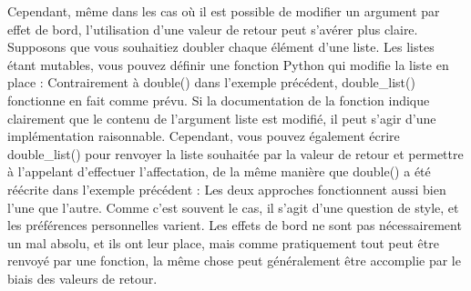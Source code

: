 Cependant, même dans les cas où il est possible de modifier un argument par effet de bord, l'utilisation d'une valeur de retour peut s'avérer plus claire.  Supposons que vous souhaitiez doubler chaque élément d'une liste.  Les listes étant mutables, vous pouvez définir une fonction Python qui modifie la liste en place :
Contrairement à double() dans l'exemple précédent, double_list() fonctionne en fait comme prévu.  Si la documentation de la fonction indique clairement que le contenu de l'argument liste est modifié, il peut s'agir d'une implémentation raisonnable.
Cependant, vous pouvez également écrire double_list() pour renvoyer la liste souhaitée par la valeur de retour et permettre à l'appelant d'effectuer l'affectation, de la même manière que double() a été réécrite dans l'exemple précédent :
Les deux approches fonctionnent aussi bien l'une que l'autre.  Comme c'est souvent le cas, il s'agit d'une question de style, et les préférences personnelles varient.  Les effets de bord ne sont pas nécessairement un mal absolu, et ils ont leur place, mais comme pratiquement tout peut être renvoyé par une fonction, la même chose peut généralement être accomplie par le biais des valeurs de retour.
